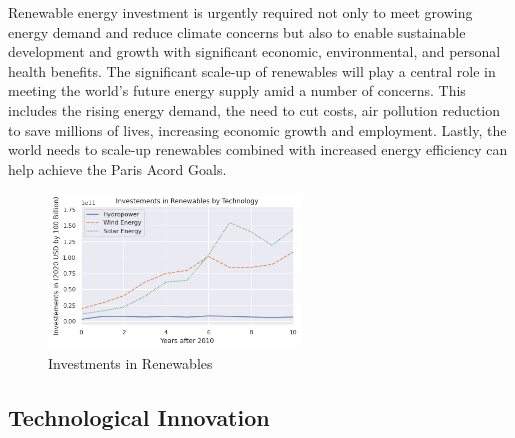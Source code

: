 \documentclass[10pt,twocolumn,letterpaper]{article}
\begin{document}
Renewable energy investment is urgently required not only to meet growing energy demand and reduce climate concerns but also to enable sustainable development and growth with significant economic, environmental, and personal health benefits. The significant scale-up of renewables will play a central role in meeting the world’s future energy supply amid a number of concerns. This includes the rising energy demand, the need to cut costs, air pollution reduction to save millions of lives, increasing economic growth and employment. Lastly, the world needs to scale-up  renewables combined with increased energy efficiency can help achieve the Paris Acord Goals.





{\scriptsize
\begin{figure}[h!]
    \centering
    \includegraphics[width=0.6\textwidth]{figures/investements_in_renewables.PNG}
    \caption{Investments in Renewables}

\end{figure}
}


\subsection{Technological Innovation}
\end{document}
